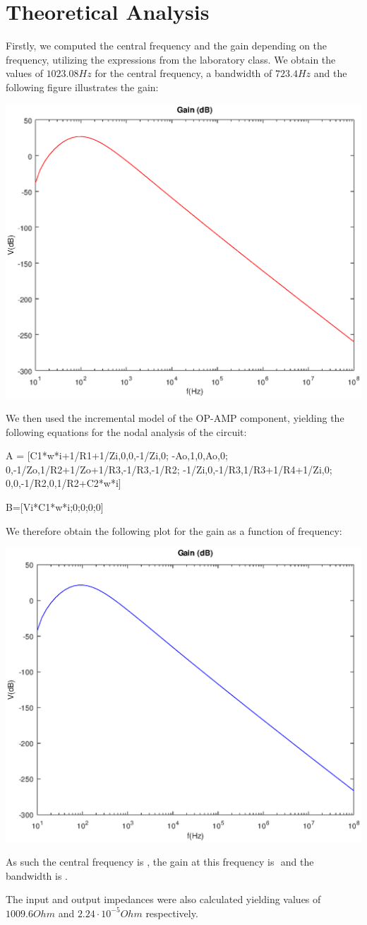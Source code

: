 \section{Theoretical Analysis}
\label{sec:analysis}

Firstly, we computed the central frequency and the gain depending on the frequency, utilizing the expressions from  the laboratory class.
We obtain the values of $1023.08 Hz$ for the central frequency, a bandwidth of $723.4 Hz$ and the following figure illustrates the gain:

\includegraphics[width=0.8\linewidth]{teodB.eps}

We then used the incremental model of the OP-AMP component, yielding the following equations for the nodal analysis of the circuit:

A = [C1*w*i+1/R1+1/Zi,0,0,-1/Zi,0;
-Ao,1,0,Ao,0;
0,-1/Zo,1/R2+1/Zo+1/R3,-1/R3,-1/R2;
-1/Zi,0,-1/R3,1/R3+1/R4+1/Zi,0;
0,0,-1/R2,0,1/R2+C2*w*i]
    
B=[Vi*C1*w*i;0;0;0;0]

We therefore obtain the following plot for the gain as a function of frequency:

\includegraphics[width=0.8\linewidth]{t5dB.eps}

As such the central frequency is $ $, the gain at this frequency is $ $ and the bandwidth is $ $.

The input and output impedances were also calculated yielding values of $1009.6 Ohm$ and $2.24\cdot 10^{-5} Ohm$ respectively.